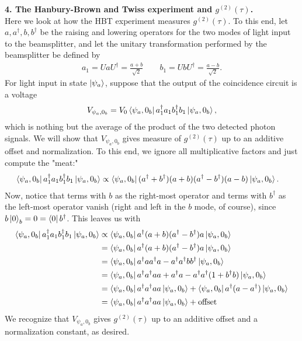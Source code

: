 \documentclass{article}
\theoremstyle{definition}
\newcommand{\f}[2]{\frac{#1}{#2}}
\begin{document}
\begin{enumerate}[label=\alph*)]
\end{enumerate}


\noindent \textbf{4. The Hanbury-Brown and Twiss experiment and $g^{(2)}(\tau)$.} \\

\noindent Here we look at how the HBT experiment measures $g^{(2)}(\tau)$. To this end, let $a,a^\dagger,b,b^\dagger$ be the raising and lowering operators for the two modes of light input to the beamsplitter, and let the unitary transformation performed by the beamsplitter be defined by 
\begin{align*}
a_1 = U a U^\dagger = \f{a+b}{\sqrt{2}} \quad\quad b_1 = UbU^\dagger = \f{a-b}{\sqrt{2}}.
\end{align*}
For light input in state $\ket{\psi_a}$, suppose that the output of the coincidence circuit is a voltage
\begin{align*}
V_{\psi_a,0_b} = V_0 \bra{\psi_a,  0_b} a_1^\dagger a_1 b_1^\dagger b_1 \ket{\psi_a, 0_b},
\end{align*}
which is nothing but the average of the product of the two detected photon signals. We will show that $V_{\psi_a,0_b}$ gives measure of $g^{(2)}(\tau)$ up to an additive offset and normalization. To this end, we ignore all multiplicative factors and just compute the "meat:"
\begin{align*}
\bra{\psi_a, 0_b} a_1^\dagger a_1 b_1^\dagger b_1 \ket{\psi_a, 0_b} 
&\propto \bra{\psi_a, 0_b}  (a^\dagger + b^\dagger)( a + b)( a^\dagger - b^\dagger)( a- b)   \ket{\psi_a, 0_b}.
\end{align*}
Now, notice that terms with $b$ as the right-most operator and terms with $b^\dagger$ as the left-most operator vanish (right and left in the $b$ mode, of course), since $b\ket{0}_b = 0 = \bra{0}b^\dagger$. This leaves us with
\begin{align*}
\bra{\psi_a, 0_b} a_1^\dagger a_1 b_1^\dagger b_1 \ket{\psi_a, 0_b}  
&\propto \bra{\psi_a, 0_b}  a^\dagger(a+b)(a^\dagger - b^\dagger) a \ket{\psi_a, 0_b}  \\
&= \bra{\psi_a, 0_b}  a^\dagger(a+b)(a^\dagger - b^\dagger) a \ket{\psi_a, 0_b}  \\
&= \bra{\psi_a, 0_b}  a^\dagger a a^\dagger a -a^\dagger a^\dagger bb^\dagger \ket{\psi_a, 0_b} \\
&= \bra{\psi_a, 0_b} a^\dagger a^\dagger a  a  + a^\dagger a - a^\dagger a^\dagger (1+b^\dagger b) \ket{\psi_a, 0_b} \\
&=  \bra{\psi_a, 0_b} a^\dagger a^\dagger a a \ket{\psi_a, 0_b} + 
 \bra{\psi_a, 0_b} a^\dagger (a - a^\dagger)  \ket{\psi_a, 0_b}\\
 &= \bra{\psi_a, 0_b} a^\dagger a^\dagger a a \ket{\psi_a, 0_b} + \text{offset}
\end{align*}
We recognize that $V_{\psi_a, 0_b}$ gives $g^{(2)}(\tau)$ up to an additive offset and a normalization constant, as desired. 
\end{document}
